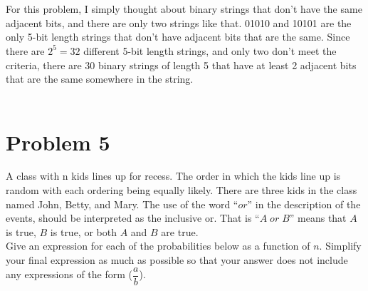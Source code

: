 \documentclass{amsart}
\theoremstyle{definition}
\theoremstyle{Exercise}
\theoremstyle{remark}
\theoremstyle{rule}
\numberwithin{equation}{section}
\begin{document}
\begin{enumerate}[label=(\alph*)]
\\\\
  For this problem, I simply thought about binary strings that don't have the same adjacent bits, and there are only two strings like that. 01010 and 10101 are the only 5-bit length strings that don't have adjacent bits that are the same. Since there are $2^5 = 32$ different 5-bit length strings, and only two don't meet the criteria, there are 30 binary strings of length 5 that have at least 2 adjacent bits that are the same somewhere in the string.
\\\\
  \end{enumerate}
\newpage
  \section*{Problem 5}
  A class with n kids lines up for recess. The order in which the kids line up is random with each ordering being equally likely. There are three kids in the class named John, Betty, and Mary. The use of the word ``$or$'' in the description of the events, should be interpreted as the inclusive or. That is ``$A \;or\; B$'' means that $A$ is true, $B$ is true, or both $A$ and $B$ are true.\\
  Give an expression for each of the probabilities below as a function of $n$. Simplify your final expression as much as possible so that your answer does not include any expressions of the form ($\dfrac{a}{b}$).
\end{document}
